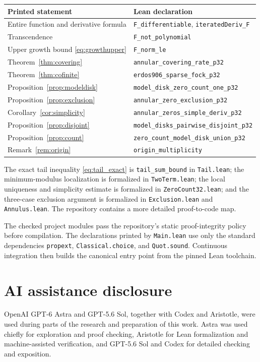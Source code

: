 \documentclass[11pt,reqno]{amsart}
\numberwithin{equation}{section}
\theoremstyle{remark}
\begin{document}
\begin{center}
\renewcommand{\arraystretch}{1.08}
\begin{tabular}{@{}p{}p{}@{}}
\toprule
Printed statement & Lean declaration \\
\midrule
Entire function and derivative formula & \texttt{F\_differentiable}, \texttt{iteratedDeriv\_F} \\
Transcendence & \texttt{F\_not\_polynomial} \\
Upper growth bound \eqref{eq:growthupper} & \texttt{F\_norm\_le} \\
Theorem~\ref{thm:covering} & \texttt{annular\_covering\_rate\_p32} \\
Theorem~\ref{thm:cofinite} & \texttt{erdos906\_sparse\_fock\_p32} \\
Proposition~\ref{prop:modeldisk} & \texttt{model\_disk\_zero\_count\_one\_p32} \\
Proposition~\ref{prop:exclusion} & \texttt{annular\_zero\_exclusion\_p32} \\
Corollary~\ref{cor:simplicity} & \texttt{annular\_zeros\_simple\_deriv\_p32} \\
Proposition~\ref{prop:disjoint} & \texttt{model\_disks\_pairwise\_disjoint\_p32} \\
Proposition~\ref{prop:count} & \texttt{zero\_count\_model\_disk\_union\_p32} \\
Remark~\ref{rem:origin} & \texttt{origin\_multiplicity} \\
\bottomrule
\end{tabular}
\end{center}

The exact tail inequality \eqref{eq:tail_exact} is \texttt{tail\_sum\_bound} in \texttt{Tail.lean}; the minimum-modulus localization is formalized in \texttt{TwoTerm.lean}; the local uniqueness and simplicity estimate is formalized in \texttt{ZeroCount32.lean}; and the three-case exclusion argument is formalized in \texttt{Exclusion.lean} and \texttt{Annulus.lean}.  The repository contains a more detailed proof-to-code map.

The checked project modules pass the repository's static proof-integrity policy before compilation.  The declarations printed by \texttt{Main.lean} use only the standard dependencies \texttt{propext}, \texttt{Classical.choice}, and \texttt{Quot.sound}.  Continuous integration then builds the canonical entry point from the pinned Lean toolchain.

\section*{AI assistance disclosure}
OpenAI GPT-6 Astra and GPT-5.6 Sol, together with Codex and Aristotle, were used during parts of the research and preparation of this work. Astra was used chiefly for exploration and proof checking, Aristotle for Lean formalization and machine-assisted verification, and GPT-5.6 Sol and Codex for detailed checking and exposition.
\end{document}
